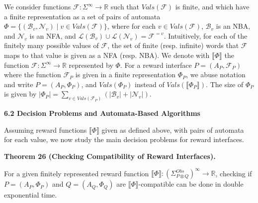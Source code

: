 We consider functions $\mathcal{F}:\Sigma^{\infty}\to\mathbb{R}$ such that $\mathit{Vals}(\mathcal{F})$ is finite, and which have a finite representation as a set of pairs of automata $\Phi=\{(\mathcal{B}_{v},\mathcal{N}_{v})\mid v\in\mathit{Vals}(\mathcal{F})\}$, where for each $v\in\mathit{Vals}(\mathcal{F})$, $\mathcal{B}_{v}$ is an NBA, and $\mathcal{N}_{v}$ is an NFA, and $\mathcal{L}(\mathcal{B}_{v})\cup\mathcal{L}(\mathcal{N}_{v})=\mathcal{F}^{=v}$. Intuitively, for each of the finitely many possible values of $\mathcal{F}$, the set of finite (resp. infinite) words that $\mathcal{F}$ maps to that value is given as a NFA (resp. NBA). We denote with $\llbracket\Phi\rrbracket$ the function $\mathcal{F}:\Sigma^{\infty}\to\mathbb{R}$ represented by $\Phi$. For a reward interface $P=(A_{P},\mathcal{F}_{P})$ where the function $\mathcal{F}_{P}$ is given in a finite representation $\Phi_{P}$, we abuse notation and write $P=(A_{P},\Phi_{P})$, and $\mathit{Vals}(\Phi_{P})$ instead of $\mathit{Vals}(\llbracket\Phi_{P}\rrbracket)$. The size of $\Phi_{P}$ is given by $|\Phi_{P}|=\sum_{v\in\mathit{Vals}(\mathcal{F}_{P})}(|\mathcal{B}_{v}|+|\mathcal{N}_{v}|)$.\par
 
 
 
 
\par\medskip\noindent\textbf{6.2 Decision Problems and Automata-Based Algorithms}\par
 
 
Assuming reward functions $\llbracket\Phi\rrbracket$ given as defined above, with pairs of automata for each value, we now study the main decision problems for reward interfaces.\par
 
 
 
\par\medskip\noindent\textbf{Theorem 26 (Checking Compatibility of Reward Interfaces).}\par
 
 
For a given finitely represented reward function $\llbracket\Phi\rrbracket:(\Sigma_{P\otimes Q}^{Obs})^{\infty}\to\mathbb{R}$, checking if $P=(A_{P},\Phi_{P})$ and $Q=(A_{Q},\Phi_{Q})$ are $\llbracket\Phi\rrbracket$-compatible can be done in double exponential time.\par
 
